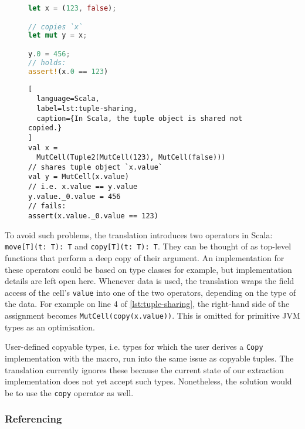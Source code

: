 \begin{figure}[hbt]
\noindent\begin{minipage}[t]{.3\textwidth}
\begin{lstlisting}[language=Rust, caption={The tuple is copied on line 4.}, label={lst:tuple-share}]
let x = (123, false);

// copies `x`
let mut y = x;

y.0 = 456;
// holds:
assert!(x.0 == 123)
\end{lstlisting}
\end{minipage}\hfill
\begin{minipage}[t]{.67\textwidth}
\begin{lstlisting}[
  language=Scala,
  label=lst:tuple-sharing,
  caption={In Scala, the tuple object is shared not copied.}
]
val x =
  MutCell(Tuple2(MutCell(123), MutCell(false)))
// shares tuple object `x.value`
val y = MutCell(x.value)
// i.e. x.value == y.value
y.value._0.value = 456
// fails:
assert(x.value._0.value == 123)
\end{lstlisting}
\end{minipage}
\end{figure}


To avoid such problems, the translation introduces two operators in Scala:
\passthrough{\lstinline!move[T](t: T): T!} and
\passthrough{\lstinline!copy[T](t: T): T!}. They can be thought of as top-level
functions that perform a deep copy of their argument. An implementation for
these operators could be based on type classes for example, but implementation
details are left open here. Whenever data is used, the translation wraps the
field access of the cell's \lstinline!value! into one of the two operators,
depending on the type of the data. For example on line 4 of
\autoref{lst:tuple-sharing}, the right-hand side of the assignment becomes
\lstinline!MutCell(copy(x.value))!. This is omitted for primitive JVM types as
an optimisation.

User-defined copyable types, i.e. types for which the user derives a
\lstinline!Copy! implementation with the macro, run into the same issue as
copyable tuples. The translation currently ignores these because the current
state of our extraction implementation does not yet accept such types.
Nonetheless, the solution would be to use the \lstinline!copy! operator as well.

\subsubsection{Referencing}

